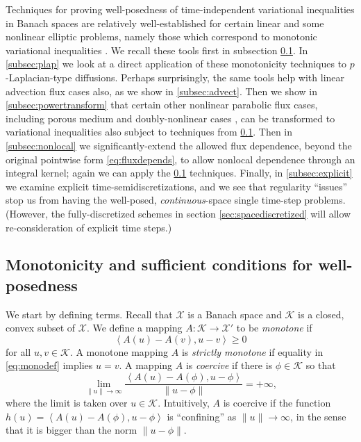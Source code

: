 \documentclass[final,leqno,onefignum,onetabnum]{siamltex1213bueler}
\newcommand{\ip}[2]{\ensuremath{\left<#1,#2\right>}}
\begin{document}
Techniques for proving well-posedness of time-independent variational inequalities in Banach spaces are relatively well-established for certain linear and some nonlinear elliptic problems, namely those which correspond to monotonic variational inequalities \cite{KinderlehrerStampacchia}.  We recall these tools first in subsection \ref{subsec:mono}.  In \ref{subsec:plap} we look at a direct application of these monotonicity techniques to $p$-Laplacian-type diffusions.  Perhaps surprisingly, the same tools help with linear advection flux cases also, as we show in \ref{subsec:advect}.  Then we show in \ref{subsec:powertransform} that certain other nonlinear parabolic flux cases, including porous medium \cite{Vazquez2007} and doubly-nonlinear cases \cite{AlonsoSantillanaDawson,BLKCB}, can be transformed to variational inequalities also subject to techniques from \ref{subsec:mono}.  Then in \ref{subsec:nonlocal} we significantly-extend the allowed flux dependence, beyond the original pointwise form \eqref{eq:fluxdepends}, to allow nonlocal dependence through an integral kernel; again we can apply the \ref{subsec:mono} techniques.  Finally, in \ref{subsec:explicit} we examine explicit time-semidiscretizations, and we see that regularity ``issues'' stop us from having the well-posed, \emph{continuous}-space single time-step problems.  (However, the fully-discretized schemes in section \ref{sec:spacediscretized} will allow re-consideration of explicit time steps.)


\subsection{Monotonicity and sufficient conditions for well-posedness} \label{subsec:mono}  We start by defining terms.  Recall that $\mathcal{X}$ is a Banach space and $\mathcal{K}$ is a closed, convex subset of $\mathcal{X}$.  We define a mapping $A : \mathcal{K} \to \mathcal{X}'$ to be \emph{monotone} \cite{KinderlehrerStampacchia} if
\begin{equation}
   \ip{A(u) - A(v)}{u-v} \ge 0  \label{eq:monodef}
\end{equation}
for all $u,v\in\mathcal{K}$.  A monotone mapping $A$ is \emph{strictly monotone} if equality in \eqref{eq:monodef} implies $u=v$.  A mapping $A$ is \emph{coercive} \cite{KinderlehrerStampacchia} if there is $\phi\in \mathcal{K}$ so that
\begin{equation}
   \lim_{\|u\|\to\infty} \frac{\ip{A(u) - A(\phi)}{u-\phi}}{\|u-\phi\|} = +\infty, \label{eq:coercivedef}
\end{equation}
where the limit is taken over $u\in\mathcal{K}$.  Intuitively, $A$ is coercive if the function $h(u)=\ip{A(u) - A(\phi)}{u-\phi}$ is ``confining'' as $\|u\|\to\infty$, in the sense that it is bigger than the norm $\|u-\phi\|$.
\end{document}
